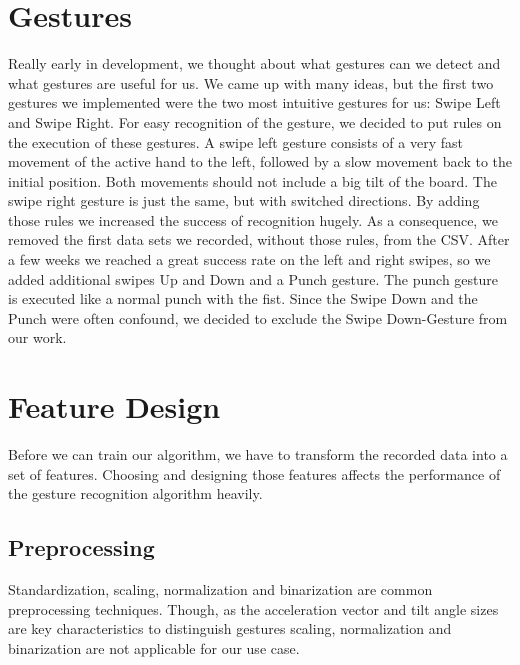 \section{Gestures}
\label{ch:DataCollection:sec:Gestures}

Really early in development, we thought about what gestures can we detect and what gestures are useful for us.
We came up with many ideas, but the first two gestures we implemented were the two most intuitive gestures for us: Swipe Left and Swipe Right.
For easy recognition of the gesture, we decided to put rules on the execution of these gestures.
A \glqq swipe left\grqq{} gesture consists of a very fast movement of the active hand to the left, followed by a slow movement back to the initial position.
Both movements should not include a big tilt of the board.
The \glqq swipe right\grqq{} gesture is just the same, but with switched directions.
By adding those rules we increased the success of recognition hugely.
As a consequence, we removed the first data sets we recorded, without those rules, from the CSV.
After a few weeks we reached a great success rate on the left and right swipes, so we added additional swipes \glqq Up\grqq{} and \glqq Down\grqq{} and a Punch gesture.
The punch gesture is executed like a normal punch with the fist.
Since the \glqq Swipe Down\grqq{} and the Punch were often confound, we decided to exclude the \glqq Swipe Down\grqq -Gesture from our work.

\section{Feature Design}
\label{ch:DataCollection:sec:FeatureDesign}

Before we can train our algorithm, we  have to transform the recorded data into a set  of  features.
Choosing  and  designing  those  features  affects  the  performance  of  the gesture recognition algorithm heavily.

\subsection{Preprocessing}
\label{ch:DataCollection:sec:FeatureDesign:sub:Preprocessing}

Standardization,     scaling,     normalization     and     binarization     are     common preprocessing techniques.
Though, as the acceleration vector and tilt angle sizes are key characteristics  to  distinguish  gestures  scaling,  normalization  and  binarization  are  not applicable for our use case. 

